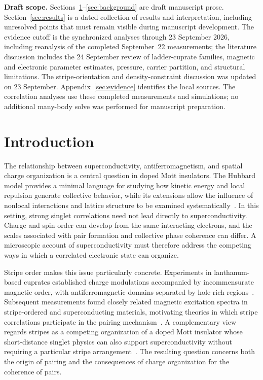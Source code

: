 \documentclass[11pt,letterpaper]{article}
\begin{document}
\noindent\textbf{Draft scope.}
Sections~\ref{sec:intro}--\ref{sec:background} are draft manuscript prose.
Section~\ref{sec:results} is a dated collection of results and interpretation,
including unresolved points that must remain visible during manuscript
development. The evidence cutoff is the synchronized analyses through
23 September 2026, including reanalysis of the completed September~22
measurements; the literature discussion includes the 24 September review of
ladder-cuprate families, magnetic and electronic parameter estimates, pressure,
carrier partition, and structural limitations. The stripe-orientation and
density-constraint discussion was updated on 23 September.
Appendix~\ref{sec:evidence} identifies the local
sources. The correlation analyses use these completed measurements and simulations;
no additional many-body solve was performed for manuscript preparation.

\tableofcontents
\clearpage

\section{Introduction}
\label{sec:intro}

The relationship between superconductivity, antiferromagnetism, and spatial
charge organization is a central question in doped Mott insulators.
The Hubbard model provides a minimal language for studying how kinetic energy
and local repulsion generate collective behavior, while its extensions allow
the influence of nonlocal interactions and lattice structure to be examined
systematically~\citep{Hubbard1963,Anderson1987,Lee2006,Arovas2022}.
In this setting, strong singlet correlations need not lead directly to
superconductivity. Charge and spin order can develop from the same interacting
electrons, and the scales associated with pair formation and collective phase
coherence can differ. A microscopic account of superconductivity must therefore
address the competing ways in which a correlated electronic state can organize.

Stripe order makes this issue particularly concrete. Experiments in
lanthanum-based cuprates established charge modulations accompanied by
incommensurate magnetic order, with antiferromagnetic domains separated by
hole-rich regions~\citep{Tranquada1995}. Subsequent measurements found closely
related magnetic excitation spectra in stripe-ordered and superconducting
materials, motivating theories in which stripe correlations participate in
the pairing mechanism~\citep{Tranquada2004}. A complementary view regards
stripes as a competing organization of a doped Mott insulator whose
short-distance singlet physics can also support superconductivity without
requiring a particular stripe arrangement~\citep{Lee2006}. The resulting
question concerns both the origin of pairing and the consequences of charge
organization for the coherence of pairs.
\end{document}
